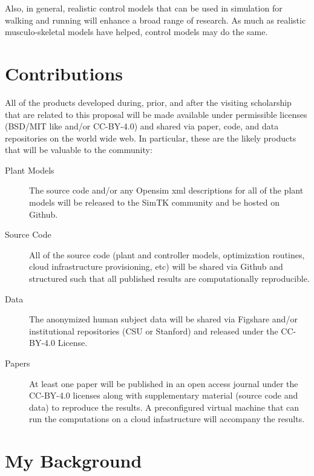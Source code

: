 \documentclass[11pt]{article}
\begin{document}
Also, in general, realistic control models that can be used in simulation for
walking and running will enhance a broad range of research. As much as
realistic musculo-skeletal models have helped, control models may do the same.

\section*{Contributions}

All of the products developed during, prior, and after the visiting scholarship
that are related to this proposal will be made available under permissible
licenses (BSD/MIT like and/or CC-BY-4.0) and shared via paper, code, and data
repositories on the world wide web. In particular, these are the likely
products that will be valuable to the community:

\begin{description}
  \item[Plant Models] The source code and/or any Opensim xml descriptions for
    all of the plant models will be released to the SimTK community and be
    hosted on Github.
  \item[Source Code] All of the source code (plant and controller models,
    optimization routines, cloud infrastructure provisioning, etc) will be
    shared via Github and structured such that all published results are
    computationally reproducible.
  \item[Data] The anonymized human subject data will be shared via Figshare
    and/or institutional repositories (CSU or Stanford) and released under the
    CC-BY-4.0 License.
  \item[Papers] At least one paper will be published in an open access journal
    under the CC-BY-4.0 licenses along with supplementary material (source code
    and data) to reproduce the results. A preconfigured virtual machine that
    can run the computations on a cloud infastructure will accompany the
    results.
\end{description}

\section*{My Background}
\end{document}
